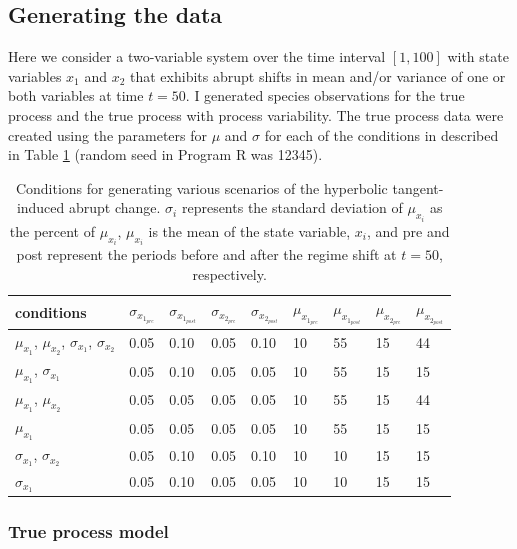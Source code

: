 \documentclass[12pt,twoside,openany]{reedthesis}
\begin{document}
\hypertarget{generating-the-data}{%
\subsection{Generating the data}\label{generating-the-data}}

Here we consider a two-variable system over the time interval \([1,100]\) with state variables \(x_1\) and \(x_2\) that exhibits abrupt shifts in mean and/or variance of one or both variables at time \(t=50\). I generated species observations for the true process and the true process with process variability. The true process data were created using the parameters for \(\mu\) and \(\sigma\) for each of the conditions in described in Table \ref{tab:sysParams} (random seed in Program R was 12345).
\begin{table}[t]

\caption{\label{tab:sysParams}Conditions for generating various scenarios of the hyperbolic tangent-induced abrupt change. $\sigma_i$ represents the standard deviation of $\mu_{x_i}$ as the percent of $\mu_{x_i}$, $\mu_{x_i}$ is the mean of the state variable, $x_i$, and pre and post represent the periods before and after the regime shift at $t=50$, respectively.}
\centering
\begin{tabular}{lllllllll}
\toprule
conditions & $\sigma_{x_{1_{pre}}}$ & $\sigma_{x_{1_{post}}}$ & $\sigma_{x_{2_{pre}}}$ & $\sigma_{x_{2_{post}}}$ & $\mu_{x_{1_{pre}}}$ & $\mu_{x_{1_{post}}}$ & $\mu_{x_{2_{pre}}}$ & $\mu_{x_{2_{post}}}$\\
\midrule
$\mu_{x_1}$, $\mu_{x_2}$, $\sigma_{x_1}$, $\sigma_{x_2}$ & 0.05 & 0.10 & 0.05 & 0.10 & 10 & 55 & 15 & 44\\
$\mu_{x_1}$, $\sigma_{x_1}$ & 0.05 & 0.10 & 0.05 & 0.05 & 10 & 55 & 15 & 15\\
$\mu_{x_1}$, $\mu_{x_2}$ & 0.05 & 0.05 & 0.05 & 0.05 & 10 & 55 & 15 & 44\\
$\mu_{x_1}$ & 0.05 & 0.05 & 0.05 & 0.05 & 10 & 55 & 15 & 15\\
$\sigma_{x_1}$, $\sigma_{x_2}$ & 0.05 & 0.10 & 0.05 & 0.10 & 10 & 10 & 15 & 15\\
\addlinespace
$\sigma_{x_1}$ & 0.05 & 0.10 & 0.05 & 0.05 & 10 & 10 & 15 & 15\\
\bottomrule
\end{tabular}
\end{table}
\hypertarget{true-process-model}{%
\subsubsection{True process model}\label{true-process-model}}
\end{document}
